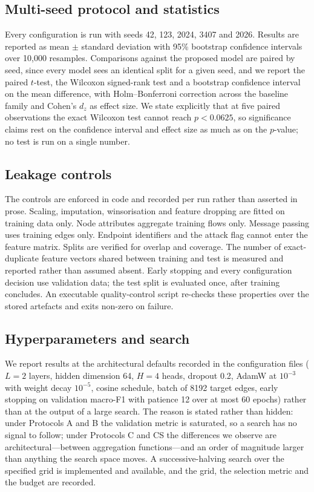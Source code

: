 \subsection{Multi-seed protocol and statistics}

Every configuration is run with seeds 42, 123, 2024, 3407 and 2026. Results
are reported as mean $\pm$ standard deviation with 95\% bootstrap confidence
intervals over 10{,}000 resamples. Comparisons against the proposed model are
paired by seed, since every model sees an identical split for a given seed, and
we report the paired $t$-test, the Wilcoxon signed-rank test and a bootstrap
confidence interval on the mean difference, with Holm--Bonferroni correction
across the baseline family and Cohen's $d_z$ as effect size. We state
explicitly that at five paired observations the exact Wilcoxon test cannot
reach $p < 0.0625$, so significance claims rest on the confidence interval and
effect size as much as on the $p$-value; no test is run on a single number.

\subsection{Leakage controls}

The controls are enforced in code and recorded per run rather than asserted in
prose. Scaling, imputation, winsorisation and feature dropping are fitted on
training data only. Node attributes aggregate training flows only. Message
passing uses training edges only. Endpoint identifiers and the attack flag
cannot enter the feature matrix. Splits are verified for overlap and coverage.
The number of exact-duplicate feature vectors shared between training and test
is measured and reported rather than assumed absent. Early stopping and every
configuration decision use validation data; the test split is evaluated once,
after training concludes. An executable quality-control script re-checks these
properties over the stored artefacts and exits non-zero on failure.

\subsection{Hyperparameters and search}

We report results at the architectural defaults recorded in the configuration
files ($L = 2$ layers, hidden dimension 64, $H = 4$ heads, dropout 0.2,
AdamW at $10^{-3}$ with weight decay $10^{-5}$, cosine schedule, batch of 8192
target edges, early stopping on validation macro-F1 with patience 12 over at
most 60 epochs) rather than at the output of a large search. The reason is
stated rather than hidden: under Protocols A and B the validation metric is
saturated, so a search has no signal to follow; under Protocols C and CS the
differences we observe are architectural---between aggregation functions---and
an order of magnitude larger than anything the search space moves. A
successive-halving search over the specified grid is implemented and available,
and the grid, the selection metric and the budget are recorded.


